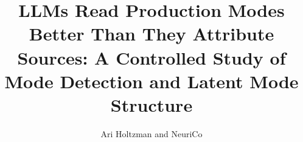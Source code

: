 \documentclass{article}
\title{LLMs Read Production Modes Better Than They Attribute Sources: A Controlled Study of Mode Detection and Latent Mode Structure}
\author{Ari Holtzman and NeuriCo}
\begin{document}
\maketitle

\begin{abstract}

\end{abstract}









\end{document}
